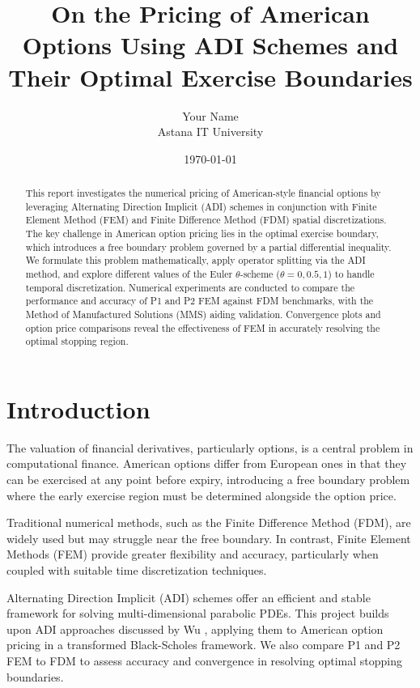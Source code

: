 \documentclass[12pt]{article}
\title{On the Pricing of American Options Using ADI Schemes and Their Optimal Exercise Boundaries}
\author{Your Name \\ Astana IT University}
\date{\today}
\begin{document}
\maketitle

\begin{abstract}
This report investigates the numerical pricing of American-style financial options by leveraging Alternating Direction Implicit (ADI) schemes in conjunction with Finite Element Method (FEM) and Finite Difference Method (FDM) spatial discretizations. The key challenge in American option pricing lies in the optimal exercise boundary, which introduces a free boundary problem governed by a partial differential inequality. We formulate this problem mathematically, apply operator splitting via the ADI method, and explore different values of the Euler $\theta$-scheme ($\theta = 0, 0.5, 1$) to handle temporal discretization. Numerical experiments are conducted to compare the performance and accuracy of P1 and P2 FEM against FDM benchmarks, with the Method of Manufactured Solutions (MMS) aiding validation. Convergence plots and option price comparisons reveal the effectiveness of FEM in accurately resolving the optimal stopping region.
\end{abstract}

\section{Introduction}

The valuation of financial derivatives, particularly options, is a central problem in computational finance. American options differ from European ones in that they can be exercised at any point before expiry, introducing a free boundary problem where the early exercise region must be determined alongside the option price.

Traditional numerical methods, such as the Finite Difference Method (FDM), are widely used but may struggle near the free boundary. In contrast, Finite Element Methods (FEM) provide greater flexibility and accuracy, particularly when coupled with suitable time discretization techniques.

Alternating Direction Implicit (ADI) schemes offer an efficient and stable framework for solving multi-dimensional parabolic PDEs. This project builds upon ADI approaches discussed by Wu \cite{wu2009fast}, applying them to American option pricing in a transformed Black-Scholes framework. We also compare P1 and P2 FEM to FDM to assess accuracy and convergence in resolving optimal stopping boundaries.
\end{document}
